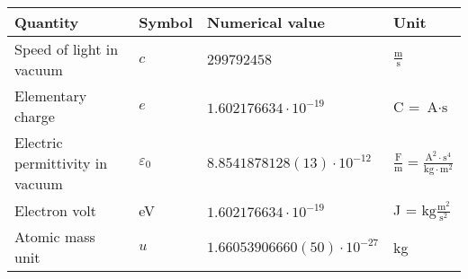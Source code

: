 \begin{tabular}{llll}
\hline
Quantity                        & Symbol & Numerical value                              & Unit \\
\hline
Speed of light in vacuum        & $c$             & $299792458$                         & $\frac{\text{m}}{\text{s}}$                  \\
Elementary charge               & $e$             & $1.602176634 \cdot 10^{-19}$        & C = $\text{A}\cdot\text{s}$                  \\
Electric permittivity in vacuum & $\varepsilon_0$ & $8.8541878128(13) \cdot 10^{-12}$   & $\frac{\text{F}}{\text{m}} = \frac{\text{A}^2\cdot\text{s}^4}{\text{kg}\cdot\text{m}^2}$ \\
Electron volt                   &  eV             & $1.602176634 \cdot 10^{-19}$        & J = $\text{kg}\frac{\text{m}^2}{\text{s}^2}$ \\
Atomic mass unit                & $u$             & $1.66053906660(50) \cdot 10^{-27}$  & kg                                           \\
\hline
\end{tabular}